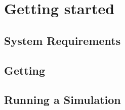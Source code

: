 \chapter{Getting started}

\section{System Requirements}

\section{Getting \mpng{}}

\section{Running a Simulation}